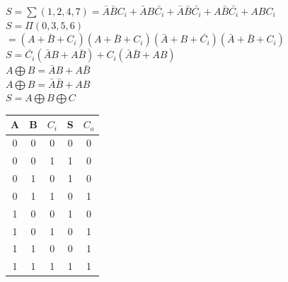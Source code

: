 \documentclass[12pt]{article}
\begin{document}
\begin{figure}[h!]
    \begin{minipage}{0.7\textwidth}
       $S=\sum(1,2,4,7)=\bar{A}\bar{B}C_{i}+\bar{A}B\bar{C_{i}}+\bar{A}\bar{B}\bar{C_{i}}+A\bar{B}\bar{C_{i}}+ABC_{i}$\\
       $S=\Pi(0,3,5,6)$\\
       $=(A+\bar{B}+C_{i})(A+\bar{B}+C_{i})(\bar{A}+B+\bar{C_{i}})(\bar{A}+\bar{B}+C_{i})$\\
       $S=\bar{C_{i}}(\bar{A}B+A\bar{B})+C_{i}(\bar{A}\bar{B}+AB)$\\
       $A\bigoplus B=\bar{A}B+A\bar{B}$\\
       $A\bigoplus B=\bar{A}\bar{B}+AB$\\
       $S=A\bigoplus B\bigoplus C$\\
    \end{minipage}
    \hfill
    \begin{minipage}{0.28\textwidth}
        \begin{tabular}{|c|c|c|c|c|}
            \hline
            A & B & $C_{i}$ & S & $C_{o}$ \\ \hline
            0 & 0 & 0 & 0 & 0 \\ \hline
            0 & 0 & 1 & 1 & 0 \\ \hline
            0 & 1 & 0 & 1 & 0 \\ \hline
            0 & 1 & 1 & 0 & 1 \\ \hline
            1 & 0 & 0 & 1 & 0 \\ \hline
            1 & 0 & 1 & 0 & 1 \\ \hline
            1 & 1 & 0 & 0 & 1 \\ \hline
            1 & 1 & 1 & 1 & 1 \\ \hline
        \end{tabular}
    \end{minipage}
\end{figure}
\end{document}
